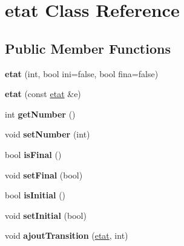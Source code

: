 \hypertarget{classetat}{\section{etat Class Reference}
\label{classetat}
}
\subsection*{Public Member Functions}
\begin{DoxyCompactItemize}
\item 
\hypertarget{classetat_a65b2ac734cc1af21fb1aea8fb873d4c9}{{\bfseries etat} (int, bool ini=false, bool fina=false)}\label{classetat_a65b2ac734cc1af21fb1aea8fb873d4c9}

\item 
\hypertarget{classetat_af42b35ca878600e1877052978a11303f}{{\bfseries etat} (const \hyperlink{classetat}{etat} \&e)}\label{classetat_af42b35ca878600e1877052978a11303f}

\item 
\hypertarget{classetat_a0eeba3eaa0ce8633957d309f04f07995}{int {\bfseries get\-Number} ()}\label{classetat_a0eeba3eaa0ce8633957d309f04f07995}

\item 
\hypertarget{classetat_ab771b2354397b5b4d3ead9a62668d44f}{void {\bfseries set\-Number} (int)}\label{classetat_ab771b2354397b5b4d3ead9a62668d44f}

\item 
\hypertarget{classetat_a89188d6ea23ce287c3f3afda46fa2858}{bool {\bfseries is\-Final} ()}\label{classetat_a89188d6ea23ce287c3f3afda46fa2858}

\item 
\hypertarget{classetat_ae4daff4d04de194b976ad489eeceb07d}{void {\bfseries set\-Final} (bool)}\label{classetat_ae4daff4d04de194b976ad489eeceb07d}

\item 
\hypertarget{classetat_a6993bd53bfd754392515e4ef5772fcdc}{bool {\bfseries is\-Initial} ()}\label{classetat_a6993bd53bfd754392515e4ef5772fcdc}

\item 
\hypertarget{classetat_a2c3e2a7b1bfda47c137aa3f6b563e369}{void {\bfseries set\-Initial} (bool)}\label{classetat_a2c3e2a7b1bfda47c137aa3f6b563e369}

\item 
\hypertarget{classetat_a3d94a2b3e6f60c9475b142e28ea495b4}{void {\bfseries ajout\-Transition} (\hyperlink{classetat}{etat}, int)}\label{classetat_a3d94a2b3e6f60c9475b142e28ea495b4}


\end{DoxyCompactItemize}
